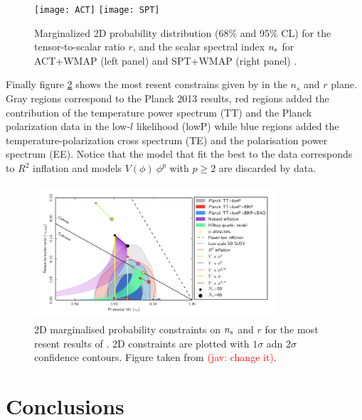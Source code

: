 \documentclass{rmaa}
\newcommand{\jav}[1]{\textcolor{red}{(jav: #1)}}
\begin{document}
\begin{figure}[h!]
 \texttt{[image: ACT]}
  \texttt{[image: SPT]}
\caption{Marginalized 2D probability distribution (68\% and 95\% CL) for the 
tensor-to-scalar ratio $r$, and the scalar spectral index $n_{\rm s}$ for ACT+WMAP (left panel)
and SPT+WMAP (right panel)
 \citep{ACT,SPT}.}
 \label{fig:SPT}
\end{figure}


Finally figure \ref{fig:infla_2}  shows the most resent constrains given by \citet{PlanckC} in the $n_s$ and $r$ plane. 
Gray regions correspond to the Planck 2013 results, red regions added the contribution of the temperature 
power spectrum (TT) and the Planck polarization data in the low-$l$ likelihood (lowP) while blue regions added 
the temperature-polarization cross spectrum (TE) and the polarisation power spectrum (EE).
Notice that the model that fit the best to the data corresponds to $R^2$ inflation \citep{Starobinsky}
and models $V(\phi)~\phi^p$ with $p\geq 2$ are discarded by data.

\begin{figure}[h!]
 \begin{center}
  \includegraphics[trim = 1mm 1mm 1mm 1mm, clip, width=9cm, height=5cm]{Planck}
\caption{2D marginalised probability constraints on $n_{\rm s}$ and $r$ for
the most resent results of \citep{PlanckC}. 2D constraints are plotted with $1\sigma$ adn $2\sigma$
confidence contours. Figure taken from \citet{PlanckC} \jav{change it}.
}\label{fig:infla_2}
\end{center}
\end{figure}	



\section{Conclusions}
\end{document}
